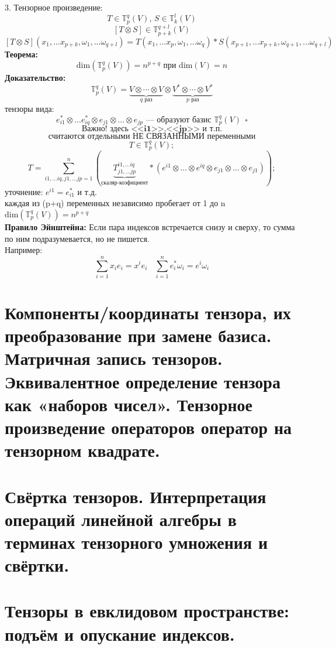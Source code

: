 \documentclass[12pt]{article}
\begin{document}
3. Тензорное произведение:\\
\[
T\in  \mathbb{T}^q_p(V) \textbf{, }S \in  \mathbb{T}^l_k(V)
\]
\[
[T \otimes S] \in \mathbb{T}^{q+l}_{p+k}(V)
\]
\[
[T \otimes S](x_1,...x_{p+k},\omega_1,...\omega_{q+l})=T(x_1,...x_p,\omega_1,...\omega_q)*S(x_{p+1},...x_{p+k},\omega_{q+1},...\omega_{q+l})
\]
\textbf{Теорема:}
\[
\mathrm{dim}(\mathbb{T}^q_p(V))=n^{p+q} \textbf{ при } \mathrm{dim}(V)=n
\]
\textbf{Доказательство:}\\
\[
\mathbb{T}^q_p(V)=\underbrace{V \otimes \cdots \otimes V}_{q \text{ раз}} \otimes \underbrace{V^* \otimes \cdots \otimes V^*}_{p \text{ раз}}
\]
тензоры вида:
\[
e_{i1}^* \otimes ... e_{iq}^* \otimes e_{j1} \otimes ...\otimes e_{jp} \textbf{ --- образуют базис } \mathbb{T}^q_p(V) \ \ \square
\]
\[\textbf{Важно! здесь <<i1>>,<<jp>> и т.п.}\]
\[\textbf{считаются отдельными НЕ СВЯЗАННЫМИ переменными}\]
\[
T \in \mathbb{T}^q_p(V);
\]
\[
T =\sum_{i1, ... iq, j1, ... jp=1}^n (\underbrace{T^{i1, ... iq}_{j1, ... jp}}_\text{скаляр-коэфициент}*(e^{i1}\otimes ...\otimes e^{iq} \otimes e_{j1} \otimes...\otimes e_{j1}));
\]
уточнение: \(e^{i1}=e^*_{i1}\) и т.д.\\
каждая из (p+q) переменных независимо пробегает от 1 до n \Rightarrow \(\mathrm{dim}(\mathbb{T}^q_p(V))=n^{p+q}\)\\
\textbf{Правило Эйнштейна:}
Если пара индексов встречается снизу и сверху, то сумма по ним подразумевается, но не пишется.\\
Например:
\[
\sum^{n}_{i=1}x_ie_i=x^ie_i \ \ \ \ \sum^n_{i=1}e_i^*\omega_i=e^i\omega_i
\]


\section{Компоненты/координаты тензора, их преобразование при замене базиса. Матричная запись тензоров. Эквивалентное определение тензора как «наборов чисел». Тензорное произведение операторов оператор на тензорном квадрате.}

\section{Свёртка тензоров. Интерпретация операций линейной алгебры в терминах тензорного умножения и свёртки.}

\section{Тензоры в евклидовом пространстве: подъём и опускание индексов.}
\end{document}
